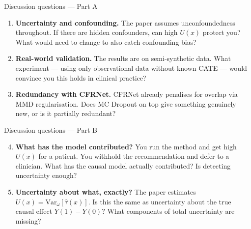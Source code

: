 \documentclass[aspectratio=169]{beamer}
\begin{document}
\begin{frame}{Discussion questions --- Part A}

\begin{enumerate}

  \item \textbf{Uncertainty and confounding.}
        The paper assumes unconfoundedness throughout.
        If there are hidden confounders, can high $U(x)$ protect you?
        What would need to change to also catch confounding bias?

  \bigskip
  \item \textbf{Real-world validation.}
        The results are on semi-synthetic data.
        What experiment --- using only observational data without known CATE ---
        would convince you this holds in clinical practice?

  \bigskip
  \item \textbf{Redundancy with CFRNet.}
        CFRNet already penalises for overlap via MMD regularisation.
        Does MC Dropout on top give something genuinely new,
        or is it partially redundant?

\end{enumerate}
\end{frame}

\begin{frame}{Discussion questions --- Part B}

\begin{enumerate}
  \setcounter{enumi}{3}

  \item \textbf{What has the model contributed?}
        You run the method and get high $U(x)$ for a patient.
        You withhold the recommendation and defer to a clinician.
        What has the causal model actually contributed?
        Is detecting uncertainty enough?

  \bigskip
  \item \textbf{Uncertainty about what, exactly?}
        The paper estimates $U(x) = \mathrm{Var}_\omega[\hat\tau(x)]$.
        Is this the same as uncertainty about the true causal effect $Y(1)-Y(0)$?
        What components of total uncertainty are missing?

\end{enumerate}
\end{frame}
\end{document}
